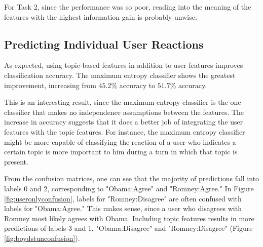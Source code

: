 For Task 2, since the performance was so poor, reading into the meaning of the features with the highest information gain is probably unwise.

\subsection{Predicting Individual User Reactions}

As expected, using topic-based features in addition to user features improves classification accuracy. The maximum entropy classifier shows the greatest improvement, increasing from $45.2\%$ accuracy to $51.7\%$ accuracy.

This is an interesting result, since the maximum entropy classifier is the one classifier that makes no independence assumptions between the features. The increase in accuracy suggests that it does a better job of integrating the user features with the topic features. For instance, the maximum entropy classifier might be more capable of classifying the reaction of a user who indicates a certain topic is more important to him during a turn in which that topic is present.

From the confusion matrices, one can see that the majority of predictions fall into labels 0 and 2, corresponding to "Obama:Agree" and "Romney:Agree." In Figure \ref{fig:useronlyconfusion}, labels for "Romney:Disagree" are often confused with labels for "Obama:Agree." This makes sense, since a user who disagrees with Romney most likely agrees with Obama. Including topic features results in more predictions of labels 3 and 1, "Obama:Disagree" and "Romney:Disagree" (Figure \ref{fig:boydstunconfusion}).
